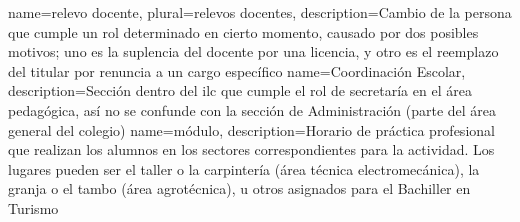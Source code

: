 {
  name={relevo docente},
  plural={relevos docentes},
  description={Cambio de la persona que cumple un rol
  determinado en cierto momento, causado por dos
  posibles motivos; uno es la suplencia del docente
  por una licencia, y otro es el reemplazo del
  titular por renuncia a un cargo específico}
}
{
  name={Coordinación Escolar},
  description={Sección dentro del \acrlong{ilc}
  que cumple el rol de secretaría en el área
  pedagógica, así no se confunde con la sección
  de Administración (parte del área general del
  colegio)}
}
{
  name={módulo},
  description={Horario de práctica profesional que
  realizan los alumnos en los sectores correspondientes
  para la actividad. Los lugares pueden ser el taller o
  la carpintería (área técnica electromecánica), la
  granja o el tambo (área agrotécnica), u otros asignados
  para el Bachiller en Turismo}
}
